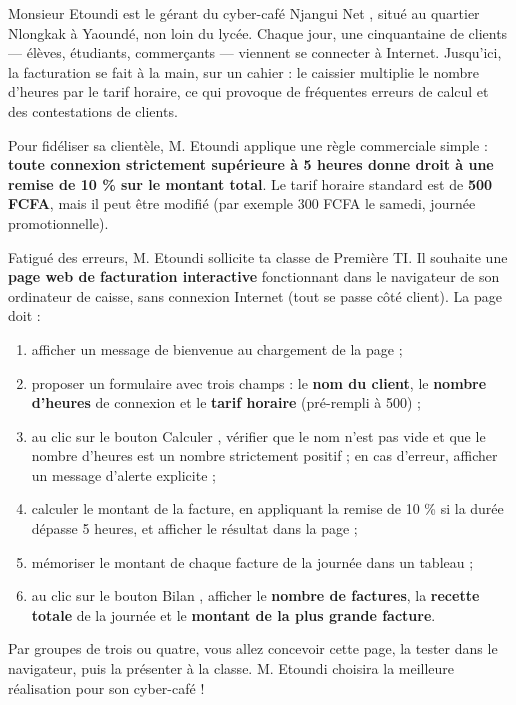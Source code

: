 \documentclass[11pt]{article}
\newcounter{popsec}
\newcounter{popsub}
\newcommand{\courssub}[1]{%
  \stepcounter{popsub}%
  \par\vspace{9pt}\noindent{\popxbold\fontsize{11.5}{13}\selectfont\color{popink}{\color{poporange}\thepopsec.\thepopsub}\hspace{6pt}#1}\par\nopagebreak\vspace{4pt}
}
\begin{document}
\courssub{Situation}

Monsieur Etoundi est le gérant du cyber-café \og Njangui Net \fg{}, situé au quartier Nlongkak à Yaoundé, non loin du lycée. Chaque jour, une cinquantaine de clients — élèves, étudiants, commerçants — viennent se connecter à Internet. Jusqu'ici, la facturation se fait à la main, sur un cahier : le caissier multiplie le nombre d'heures par le tarif horaire, ce qui provoque de fréquentes erreurs de calcul et des contestations de clients.

Pour fidéliser sa clientèle, M. Etoundi applique une règle commerciale simple : \textbf{toute connexion strictement supérieure à 5 heures donne droit à une remise de 10 \% sur le montant total}. Le tarif horaire standard est de \textbf{500 FCFA}, mais il peut être modifié (par exemple 300 FCFA le samedi, journée promotionnelle).

Fatigué des erreurs, M. Etoundi sollicite ta classe de Première TI. Il souhaite une \textbf{page web de facturation interactive} fonctionnant dans le navigateur de son ordinateur de caisse, sans connexion Internet (tout se passe côté client). La page doit :

\begin{enumerate}
\item afficher un message de bienvenue au chargement de la page ;
\item proposer un formulaire avec trois champs : le \textbf{nom du client}, le \textbf{nombre d'heures} de connexion et le \textbf{tarif horaire} (pré-rempli à 500) ;
\item au clic sur le bouton \og Calculer \fg{}, vérifier que le nom n'est pas vide et que le nombre d'heures est un nombre strictement positif ; en cas d'erreur, afficher un message d'alerte explicite ;
\item calculer le montant de la facture, en appliquant la remise de 10 \% si la durée dépasse 5 heures, et afficher le résultat dans la page ;
\item mémoriser le montant de chaque facture de la journée dans un tableau ;
\item au clic sur le bouton \og Bilan \fg{}, afficher le \textbf{nombre de factures}, la \textbf{recette totale} de la journée et le \textbf{montant de la plus grande facture}.
\end{enumerate}

Par groupes de trois ou quatre, vous allez concevoir cette page, la tester dans le navigateur, puis la présenter à la classe. M. Etoundi choisira la meilleure réalisation pour son cyber-café !
\end{document}
